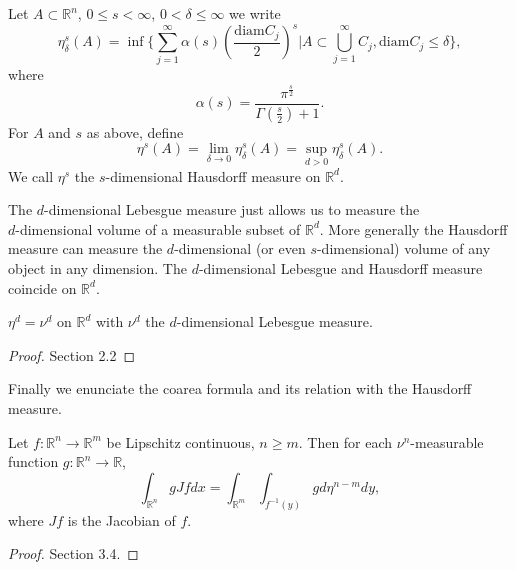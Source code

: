 \begin{defn}
 Let $A\subset \mathbb{R}^n$, $0\leq s <\infty$, $0<\delta\leq\infty$ we write
$$\eta_ \delta^s(A)=\inf\lbrace\sum_{j=1}^\infty\alpha(s)(\frac{\mbox{diam} C_j}{2})^s\vert A\subset\bigcup_{j=1}^\infty C_j, \mbox{diam}C_j\leq\delta\rbrace,$$
where $$\alpha(s)=\frac{\pi^\frac{s}{2}}{\Gamma(\frac{s}{2})+1}.$$
For $A$ and $s$ as above, define
$$\eta^s(A)=\lim_{\delta\rightarrow 0}\eta_ \delta^s(A)=\sup_{d>0}\eta_ \delta^s(A).$$
We call $\eta^s$ the $s$-dimensional Hausdorff measure on $\mathbb{R}^d$. 
\end{defn}

The $d$-dimensional Lebesgue measure just allows us to measure the\\ $d$-dimensional volume of a measurable subset of $\mathbb{R}^d$. More generally the Hausdorff measure can measure the $d$-dimensional (or even $s$-dimensional) volume of any object in any dimension. The $d$-dimensional Lebesgue and Hausdorff measure coincide on $\mathbb{R}^d$.

\begin{thm}$\eta^d=\nu ^d $ on $\mathbb{R}^d$ with $\nu^d $ the $d$-dimensional Lebesgue measure.
\end{thm}
\begin{proof}
\cite{Eva} Section 2.2
\end{proof}

Finally we enunciate the coarea formula and its relation with the Hausdorff measure.

\begin{thm} Let $f:\mathbb{R}^n\rightarrow\mathbb{R}^m$ be Lipschitz continuous, $n\geq m$. Then for each $\nu^n$-measurable function $g:\mathbb{R}^n\rightarrow\mathbb{R}$,
$$\int_{\mathbb{R}^n}gJfdx=\int_{\mathbb{R}^m}\int_{f^{-1}(y)}gd\eta^{n-m}dy, $$
where $Jf$ is the Jacobian of $f$.
\end{thm}
\begin{proof}
\cite{Eva} Section 3.4.
\end{proof}

